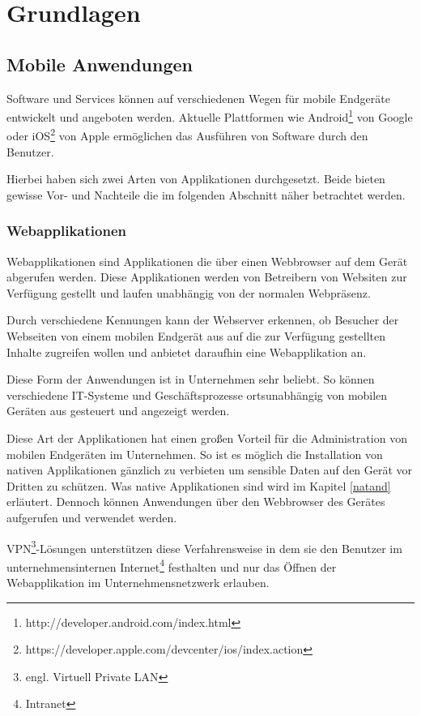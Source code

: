 \section{Grundlagen}

\subsection{Mobile Anwendungen}

Software und Services können auf verschiedenen Wegen für mobile Endgeräte entwickelt und angeboten werden. Aktuelle Plattformen wie Android\footnote{http://developer.android.com/index.html} von Google oder iOS\footnote{https://developer.apple.com/devcenter/ios/index.action} von Apple ermöglichen das Ausführen von Software durch den Benutzer.

Hierbei haben sich zwei Arten von Applikationen durchgesetzt. Beide bieten gewisse Vor- und Nachteile die im folgenden Abschnitt näher betrachtet werden.

\subsubsection{Webapplikationen}

Webapplikationen sind Applikationen die über einen Webbrowser auf dem Gerät abgerufen werden. Diese Applikationen werden von Betreibern von Websiten zur Verfügung gestellt und laufen unabhängig von der normalen Webpräsenz.

Durch verschiedene Kennungen kann der Webserver erkennen, ob Besucher der Webseiten von einem mobilen Endgerät aus auf die zur Verfügung gestellten Inhalte zugreifen wollen und anbietet daraufhin eine Webapplikation an.

Diese Form der Anwendungen ist in Unternehmen sehr beliebt. So können verschiedene IT-Systeme und Geschäftsprozesse ortsunabhängig von mobilen Geräten aus gesteuert und angezeigt werden.

Diese Art der Applikationen hat einen großen Vorteil für die Administration von mobilen Endgeräten im Unternehmen. So ist es möglich die Installation von nativen Applikationen gänzlich zu verbieten um sensible Daten auf den Gerät vor Dritten zu schützen. Was native Applikationen sind wird im Kapitel \ref{natand} erläutert. Dennoch können Anwendungen über den Webbrowser des Gerätes aufgerufen und verwendet werden.

VPN\footnote{engl. Virtuell Private LAN}-Lösungen unterstützen diese Verfahrensweise in dem sie den Benutzer im unternehmensinternen Internet\footnote{Intranet} festhalten und nur das Öffnen der Webapplikation im Unternehmensnetzwerk erlauben.

